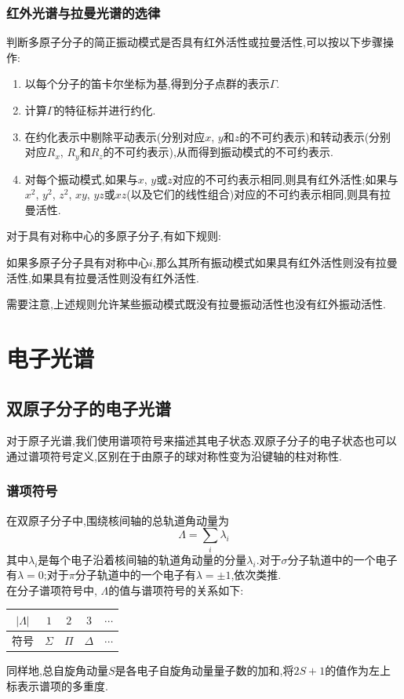 \documentclass{ctexbook}
\begin{document}
\subsubsection{红外光谱与拉曼光谱的选律}
判断多原子分子的简正振动模式是否具有红外活性或拉曼活性,可以按以下步骤操作:
\begin{enumerate}[label=\tbf{\alph*.}]
    \item 以每个分子的笛卡尔坐标为基,得到分子点群的表示$\Gamma$.
    \item 计算$\Gamma$的特征标并进行约化.
    \item 在约化表示中剔除平动表示(分别对应$x$, $y$和$z$的不可约表示)和转动表示(分别对应$R_x$, $R_y$和$R_z$的不可约表示),从而得到振动模式的不可约表示.
    \item 对每个振动模式,如果与$x$, $y$或$z$对应的不可约表示相同,则具有红外活性;如果与$x^2$, $y^2$, $z^2$, $xy$, $yz$或$xz$(以及它们的线性组合)对应的不可约表示相同,则具有拉曼活性.
\end{enumerate}
对于具有对称中心的多原子分子,有如下规则:
\begin{theorem}[具有对称中心的多原子分子的振动光谱选律]
    如果多原子分子具有对称中心$i$,那么其所有振动模式如果具有红外活性则没有拉曼活性,如果具有拉曼活性则没有红外活性.
\end{theorem}
需要注意,上述规则允许某些振动模式既没有拉曼振动活性也没有红外振动活性.
\section{电子光谱}
\subsection{双原子分子的电子光谱}
对于原子光谱,我们使用谱项符号来描述其电子状态.双原子分子的电子状态也可以通过谱项符号定义,区别在于由原子的球对称性变为沿键轴的柱对称性.
\subsubsection{谱项符号}
在双原子分子中,围绕核间轴的总轨道角动量为
\[\Lambda=\sum_{i}\lambda_i\]
其中$\lambda_i$是每个电子沿着核间轴的轨道角动量的分量$\lambda_i$.对于$\sigma$分子轨道中的一个电子有$\lambda=0$;对于$\pi$分子轨道中的一个电子有$\lambda=\pm1$,依次类推.\\
\indent 在分子谱项符号中, $\Lambda$的值与谱项符号的关系如下:
\begin{table}[H]\begin{center}
    \begin{tabular}{ccccc}\hline
        $|\Lambda|$ & $1$ & $2$ & $3$ & $\cdots$ \\\hline
        符号 & $\Sigma$ & $\Pi$ & $\Delta$ & $\cdots$\\\hline
    \end{tabular}
\end{center}
同样地,总自旋角动量$S$是各电子自旋角动量量子数的加和,将$2S+1$的值作为左上标表示谱项的多重度.
\end{table}
\end{document}
